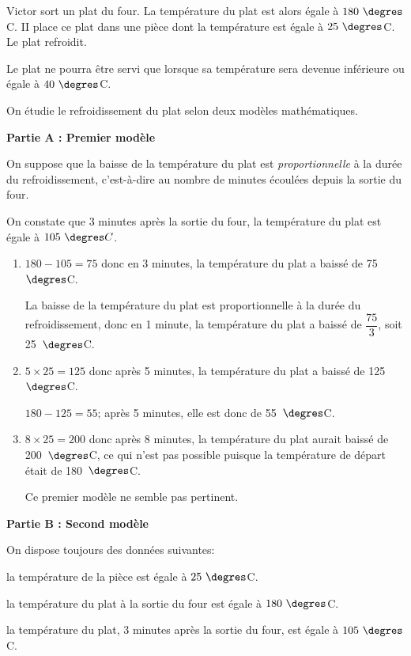 \medskip

Victor sort un plat du four. La température du plat est alors égale à $180~\degres$C. II place ce plat dans une pièce dont la température est égale à $25~\degres$C. Le plat refroidit.

Le plat ne pourra être servi que lorsque sa température sera devenue inférieure ou égale à $40~\degres$C.

On étudie le refroidissement du plat selon deux modèles mathématiques.

\bigskip

\textbf{Partie A : Premier modèle}

\medskip

On suppose que la baisse de la température du plat est \textit{proportionnelle} à la durée du refroidissement, c'est-à-dire au nombre de minutes écoulées depuis la sortie du four.

On constate que 3 minutes après la sortie du four, la température du plat est égale à $105~\degres C$.

\begin{enumerate}
\item 
$180-105=75$ donc en 3 minutes, la température du plat a baissé de 75~$\degres$C.

La baisse de la température du plat est proportionnelle à la durée du refroidissement, donc en 1 minute, la température du plat a baissé de $\dfrac{75}{3}$, soit 25~$\degres$C.

\item 
$5\times 25=125$ donc après 5 minutes, la température du plat a baissé de 125~$\degres$C.

$180-125=55$; après 5 minutes, elle est donc de 55~$\degres$C.

\item 
$8\times 25=200$ donc après 8 minutes, la température du plat aurait baissé de 200~$\degres$C, ce qui n'est pas possible puisque la température de départ était de 180~$\degres$C.

Ce premier modèle ne semble pas pertinent.

\end{enumerate}


\textbf{Partie B : Second modèle}

\medskip

\begin{list}{\textbullet}{On dispose toujours des données suivantes:}
\item la température de la pièce est égale à $25~\degres$C.
\item la température du plat à la sortie du four est égale à $180~\degres$C.
\item la température du plat, 3 minutes après la sortie du four, est égale à $105~\degres$C.
\end{list}

